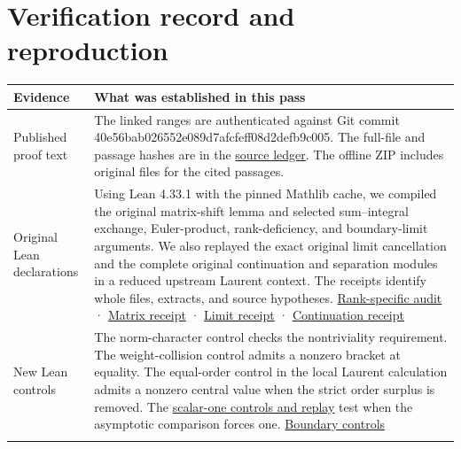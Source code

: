 \documentclass[11pt,letterpaper]{article}
\begin{document}
\section{Verification record and reproduction}
{\small
\begin{longtable}{@{}>{\raggedright\arraybackslash}p{0.22\dimexpr\linewidth-2\tabcolsep\relax}>{\raggedright\arraybackslash}p{0.78\dimexpr\linewidth-2\tabcolsep\relax}@{}}
\toprule
\textbf{Evidence} & \textbf{What was established in this pass}\\\midrule\endhead
Published proof text & The linked ranges are authenticated against Git commit {\ttfamily\small 40e56bab026552\allowbreak{}e089d7afcfeff0\allowbreak{}8d2defb9c005}. The full-file and passage hashes are in the \href{https://github.com/nousentllc/riemann-hypothesis/blob/2c03d15e908bcbe4aae3c94a87c7ada402cd7911/research/uriel/experiments/siegel-weil-constant-term/source_trace.json}{source ledger}. The offline ZIP includes original files for the cited passages.\\\addlinespace[4pt]
Original Lean declarations & Using Lean 4.33.1 with the pinned Mathlib cache, we compiled the original matrix-shift lemma and selected sum–integral exchange, Euler-product, rank-deficiency, and boundary-limit arguments. We also replayed the exact original limit cancellation and the complete original continuation and separation modules in a reduced upstream Laurent context. The receipts identify whole files, extracts, and source hypotheses. \href{https://github.com/nousentllc/riemann-hypothesis/blob/2c03d15e908bcbe4aae3c94a87c7ada402cd7911/research/uriel/experiments/siegel-weil-constant-term/verification/README.md}{Rank-specific audit} · \href{https://github.com/nousentllc/riemann-hypothesis/blob/2c03d15e908bcbe4aae3c94a87c7ada402cd7911/research/uriel/experiments/siegel-weil-constant-term/orbit-cell/leaf_receipt.json}{Matrix receipt} · \href{https://github.com/nousentllc/riemann-hypothesis/blob/2c03d15e908bcbe4aae3c94a87c7ada402cd7911/research/uriel/experiments/siegel-weil-constant-term/normalization/receipt.json}{Limit receipt} · \href{https://github.com/nousentllc/riemann-hypothesis/blob/2c03d15e908bcbe4aae3c94a87c7ada402cd7911/research/uriel/experiments/siegel-weil-constant-term/continuation/receipt.json}{Continuation receipt}\\\addlinespace[4pt]
New Lean controls & The norm-character control checks the nontriviality requirement. The weight-collision control admits a nonzero bracket at equality. The equal-order control in the local Laurent calculation admits a nonzero central value when the strict order surplus is removed. The \href{https://github.com/nousentllc/riemann-hypothesis/blob/2c03d15e908bcbe4aae3c94a87c7ada402cd7911/research/uriel/experiments/siegel-weil-constant-term/positive-codimension/README.md}{scalar-one controls and replay} test when the asymptotic comparison forces one. \href{https://github.com/nousentllc/riemann-hypothesis/blob/2c03d15e908bcbe4aae3c94a87c7ada402cd7911/research/uriel/experiments/siegel-weil-constant-term/verification/Controls.lean}{Boundary controls}\\\addlinespace[4pt]

\end{longtable}}
\end{document}
